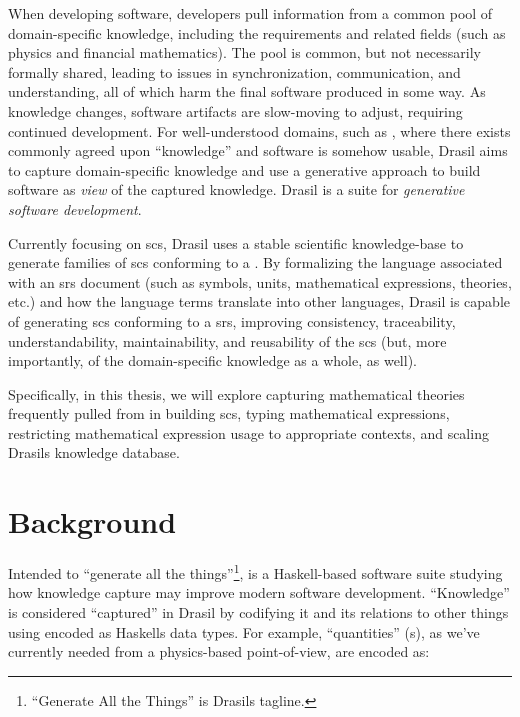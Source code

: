 When developing software, developers pull information from a common pool of
domain-specific knowledge, including the requirements and related fields (such
as physics and financial mathematics). The pool is common, but not necessarily
formally shared, leading to issues in synchronization, communication, and
understanding, all of which harm the final software produced in some way. As
knowledge changes, software artifacts are slow-moving to adjust, requiring
continued development. For well-understood domains, such as , where
there exists commonly agreed upon ``knowledge'' and software is somehow usable,
Drasil aims to capture domain-specific knowledge and use a generative approach
to build software as \textit{view} of the captured knowledge. Drasil is a suite
for \textit{generative software development}.

Currently focusing on \acs{scs}, Drasil uses a stable scientific knowledge-base
to generate families of \acs{scs} conforming to a 
\cite{SmithAndLai2005}. By formalizing the language associated with an \acf{srs}
document (such as symbols, units, mathematical expressions, theories, etc.) and
how the language terms translate into other languages, Drasil is capable of
generating \acs{scs} conforming to a \acf{srs}, improving consistency,
traceability, understandability, maintainability, and reusability of the
\acf{scs} (but, more importantly, of the domain-specific knowledge as a whole,
as well).

Specifically, in this thesis, we will explore capturing mathematical theories
frequently pulled from in building \acs{scs}, typing mathematical expressions,
restricting mathematical expression usage to appropriate contexts, and scaling
Drasils knowledge database.

\section{Background}
\label{sec:intro:background}

Intended to ``generate all the things''\footnote{``Generate All the Things'' is
      Drasils tagline.},
 is a
Haskell-based \cite{Haskell2010} software suite studying how knowledge
capture may improve modern software development. ``Knowledge'' is
considered ``captured'' in Drasil by codifying it and its relations to
other things using  encoded as Haskells data types. For example,
``quantities'' (\QuantityDict{}s), as we've currently needed from a
physics-based point-of-view, are encoded as:

